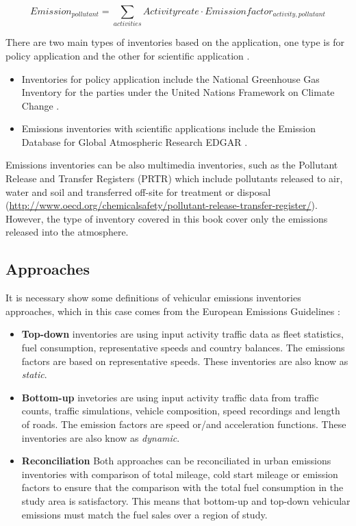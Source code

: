 \documentclass[12pt,graybox,envcountchap,sectrefs]{krantz}
\providecommand{\tightlist}{%
  \setlength{\itemsep}{0pt}\setlength{\parskip}{0pt}}
\theoremstyle{definition}
\theoremstyle{definition}
\theoremstyle{definition}
\theoremstyle{remark}
\begin{document}
\begin{equation}
Emission_{pollutant}=\sum_{activities} Activity reate \cdot Emission factor_{activity, pollutant}
\label{eq:efGERAL}
\end{equation}

There are two main types of inventories based on the application, one
type is for policy application and the other for scientific application
\citep{pulles2010art}.

\begin{itemize}
\tightlist
\item
  Inventories for policy application include the National Greenhouse Gas
  Inventory for the parties under the United Nations Framework on
  Climate Change \citep{unfccc}.
\item
  Emissions inventories with scientific applications include the
  Emission Database for Global Atmospheric Research EDGAR \citep{edgar}.
\end{itemize}

Emissions inventories can be also multimedia inventories, such as the
Pollutant Release and Transfer Registers (PRTR) which include pollutants
released to air, water and soil and transferred off-site for treatment
or disposal
(\url{http://www.oecd.org/chemicalsafety/pollutant-release-transfer-register/}).
However, the type of inventory covered in this book cover only the
emissions released into the atmosphere.

\subsection{Approaches}\label{approaches}

It is necessary show some definitions of vehicular emissions inventories
approaches, which in this case comes from the European Emissions
Guidelines \citep{NtziachristosSamaras2016}:

\begin{itemize}
\tightlist
\item
  \textbf{Top-down} inventories are using input activity traffic data as
  fleet statistics, fuel consumption, representative speeds and country
  balances. The emissions factors are based on representative speeds.
  These inventories are also know as \emph{static}.
\item
  \textbf{Bottom-up} invetories are using input activity traffic data
  from traffic counts, traffic simulations, vehicle composition, speed
  recordings and length of roads. The emission factors are speed or/and
  acceleration functions. These inventories are also know as
  \emph{dynamic}.
\item
  \textbf{Reconciliation} Both approaches can be reconciliated in urban
  emissions inventories with comparison of total mileage, cold start
  mileage or emission factors to ensure that the comparison with the
  total fuel consumption in the study area is satisfactory. This means
  that bottom-up and top-down vehicular emissions must match the fuel
  sales over a region of study.
\end{itemize}
\end{document}
